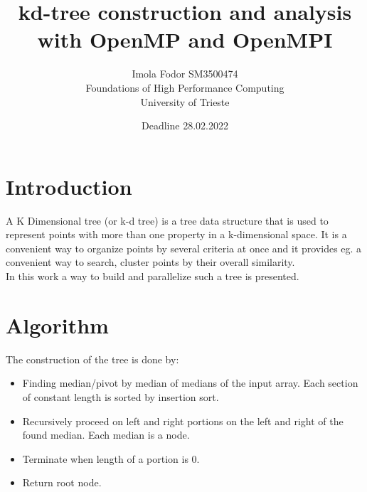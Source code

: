 \documentclass[11pt]{article}
\title{kd-tree construction and analysis with OpenMP and OpenMPI}
\date{Deadline 28.02.2022}
\author{Imola Fodor SM3500474 \\Foundations of High Performance Computing \\University of Trieste}
\begin{document}
\maketitle
\tableofcontents

\newpage

\section{Introduction}
A K Dimensional tree (or k-d tree) is a tree data structure that is used to represent points with more than one property in a k-dimensional space. It is a convenient way to organize points by several criteria at once and it provides eg. a convenient way to search, cluster points by their overall similarity. \\ In this work a way to build and parallelize such a tree is presented.
\section{Algorithm}
The construction of the tree is done by:
\begin{itemize}
  \item Finding median/pivot by median of medians of the input array. Each section of constant length is sorted by insertion sort. 
  \item Recursively proceed on left and right portions on the left and right of the found median. Each median is a node.
  \item Terminate when length of a portion is 0. 
  \item Return root node.
\end{itemize}
\end{document}
